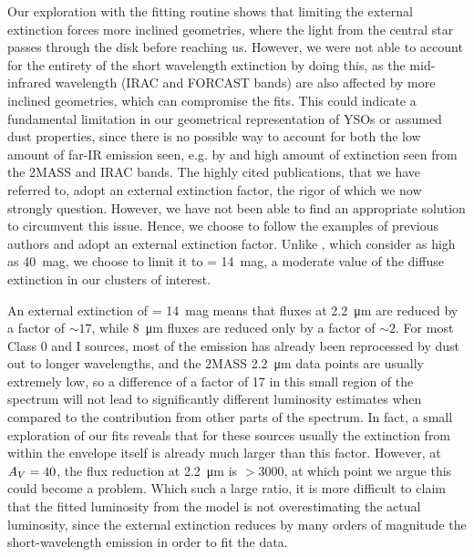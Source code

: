 Our exploration with the fitting routine shows that limiting the external extinction forces more inclined geometries, where the light from the central star passes through the disk before reaching us. However, we were not able to account for the entirety of the short wavelength extinction by doing this, as the mid-infrared wavelength (IRAC and FORCAST bands) are also affected by more inclined geometries, which can compromise the fits. This could indicate a fundamental limitation in our geometrical representation of YSOs or assumed dust properties, since there is no possible way to account for both the low amount of far-IR emission seen, e.g. by \Herschel and high amount of extinction seen from the 2MASS and IRAC bands. The highly cited publications, that we have referred to, adopt an external extinction factor, the rigor of which we now strongly question. However, we have not been able to find an appropriate solution to circumvent this issue.  Hence, we choose to follow the examples of previous authors and adopt an external extinction factor. Unlike \citet{Furlan:2016df}, which consider \Av as high as 40~mag, we choose to limit it to \Av = 14~mag, a moderate value of the diffuse extinction in our clusters of interest. 

An external extinction of \Av = 14~mag means that fluxes at \SI{2.2}{\um} are reduced by a factor of $\sim 17$, while \SI{8}{\um} fluxes are reduced only by a factor of $\sim 2$. For most Class 0 and I sources, most of the emission has already been reprocessed by dust out to longer wavelengths, and the 2MASS \SI{2.2}{\um} data points are usually extremely low, so a difference of a factor of 17 in this small region of the spectrum will not lead to significantly different luminosity estimates when compared to the contribution from other parts of the spectrum. In fact, a small exploration of our fits reveals that for these sources usually the extinction from within the envelope itself is already much larger than this factor. However, at $A_V = 40$, the flux reduction at \SI{2.2}{\um} is $>3000$, at which point we argue this could become a problem. Which such a large ratio, it is more difficult to claim that the fitted luminosity from the model is not overestimating the actual luminosity, since the external extinction reduces by many orders of magnitude the short-wavelength emission in order to fit the data. 

